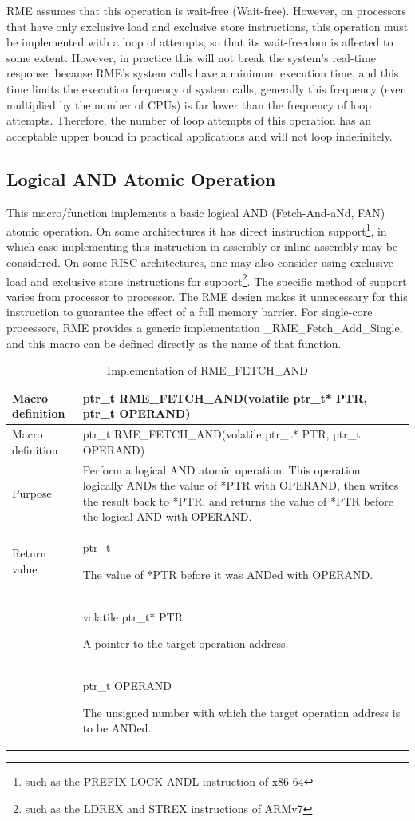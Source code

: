 RME assumes that this operation is wait-free (Wait-free). However, on processors that have only exclusive load and exclusive store instructions, this operation must be implemented with a loop of attempts, so that its wait-freedom is affected to some extent. However, in practice this will not break the system's real-time response: because RME's system calls have a minimum execution time, and this time limits the execution frequency of system calls, generally this frequency (even multiplied by the number of CPUs) is far lower than the frequency of loop attempts. Therefore, the number of loop attempts of this operation has an acceptable upper bound in practical applications and will not loop indefinitely.

\newpage
\subsection{Logical AND Atomic Operation}\label{subsec:7-logical-and-atomic-operation}

This macro/function implements a basic logical AND (Fetch-And-aNd, FAN) atomic operation. On some architectures it has direct instruction support\footnote{such as the PREFIX LOCK ANDL instruction of x86-64}, in which case implementing this instruction in assembly or inline assembly may be considered. On some RISC architectures, one may also consider using exclusive load and exclusive store instructions for support\footnote{such as the LDREX and STREX instructions of ARMv7}. The specific method of support varies from processor to processor. The RME design makes it unnecessary for this instruction to guarantee the effect of a full memory barrier. For single-core processors, RME provides a generic implementation \_RME\_Fetch\_Add\_Single, and this macro can be defined directly as the name of that function.

\begin{xltabular}{\textwidth}{@{}>{\hsize\raggedright\arraybackslash}X>{\hsize\raggedright\arraybackslash}X@{}}
\caption{Implementation of RME\_FETCH\_AND}\label{tab:7-33-rme-fetch-and-implementation}\\
\toprule
Macro definition & ptr\_t RME\_FETCH\_AND(volatile ptr\_t* PTR, ptr\_t
OPERAND)\tabularnewline
\endfirsthead
\toprule
Macro definition & ptr\_t RME\_FETCH\_AND(volatile ptr\_t* PTR, ptr\_t
OPERAND)\tabularnewline
\midrule
\endhead
\bottomrule
\endlastfoot
Purpose &
Perform a logical AND atomic operation. This operation logically ANDs the value of *PTR with OPERAND, then writes the result back to *PTR, and returns the value of *PTR before the logical AND with OPERAND.\tabularnewline
Return value\strut
 & ptr\_t

The value of *PTR before it was ANDed with OPERAND.\strut
\tabularnewline
{} & volatile ptr\_t* PTR

A pointer to the target operation address.\strut
\tabularnewline
\strut
 & ptr\_t OPERAND

The unsigned number with which the target operation address is to be ANDed.\strut
\tabularnewline
\end{xltabular}
\nopagebreak[4]

